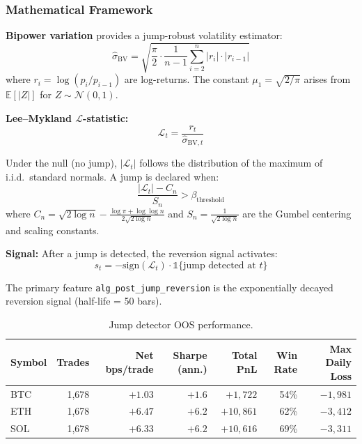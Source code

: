 \documentclass[11pt,a4paper]{article}
\newcommand{\toprule}{\hline\hline}
\newcommand{\midrule}{\hline}
\newcommand{\bottomrule}{\hline\hline}
\begin{document}
\subsubsection*{Mathematical Framework}

\textbf{Bipower variation} provides a jump-robust volatility estimator:
\begin{equation}
\hat{\sigma}_{\mathrm{BV}} = \sqrt{\frac{\pi}{2} \cdot \frac{1}{n-1} \sum_{i=2}^{n} |r_i| \cdot |r_{i-1}|}
\end{equation}
where $r_i = \log(p_i / p_{i-1})$ are log-returns. The constant $\mu_1 = \sqrt{2/\pi}$ arises from $\mathbb{E}[|Z|]$ for $Z \sim \mathcal{N}(0,1)$.

\textbf{Lee--Mykland $\mathcal{L}$-statistic:}
\begin{equation}
\mathcal{L}_t = \frac{r_t}{\hat{\sigma}_{\mathrm{BV},t}}
\end{equation}

Under the null (no jump), $|\mathcal{L}_t|$ follows the distribution of the maximum of i.i.d.\ standard normals. A jump is declared when:
\begin{equation}
\frac{|\mathcal{L}_t| - C_n}{S_n} > \beta_{\text{threshold}}
\end{equation}
where $C_n = \sqrt{2 \log n} - \frac{\log \pi + \log \log n}{2\sqrt{2 \log n}}$ and $S_n = \frac{1}{\sqrt{2 \log n}}$ are the Gumbel centering and scaling constants.

\textbf{Signal:} After a jump is detected, the reversion signal activates:
\begin{equation}
s_t = -\mathrm{sign}(\mathcal{L}_t) \cdot \mathbb{1}\{\text{jump detected at } t\}
\end{equation}

The primary feature \texttt{alg\_post\_jump\_reversion} is the exponentially decayed reversion signal (half-life = 50 bars).

\begin{table}[h!]
\centering
\caption{Jump detector OOS performance.}
\begin{tabular}{@{}lrrrrrr@{}}
\toprule
Symbol & Trades & Net bps/trade & Sharpe (ann.) & Total PnL & Win Rate & Max Daily Loss \\
\midrule
BTC & 1{,}678 & $+1.03$ & $+1.6$ & $+1{,}722$ & 54\% & $-1{,}981$ \\
ETH & 1{,}678 & $+6.47$ & $+6.2$ & $+10{,}861$ & 62\% & $-3{,}412$ \\
SOL & 1{,}678 & $+6.33$ & $+6.2$ & $+10{,}616$ & 69\% & $-3{,}311$ \\
\bottomrule
\end{tabular}
\end{table}
\end{document}
